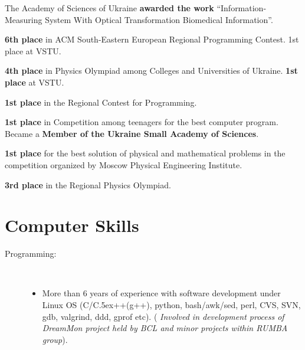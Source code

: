\documentclass[10pt,overlapped,line]{res}
\def\Cplusplus{{\rm C\raise.5ex\hbox{\small ++}}}
\newcommand{\mplace}[1]{\textbf{#1}}
\newcommand{\wdescription}[1]{({\small \textit{#1}})}
\begin{document}
\begin{resume}
 \begin{position}
   The Academy of Sciences of Ukraine \mplace{awarded the work}
   ``Information-Measuring System With Optical Transformation
   Biomedical Information''.
 \end{position}

 \begin{position}
   \mplace{6th place} in ACM South-Eastern European Regional
   Programming Contest. 1st place at VSTU.
 \end{position}

 \begin{position}
   \mplace{4th place} in Physics Olympiad among Colleges and
   Universities of Ukraine. \mplace{1st place} at VSTU.
 \end{position}

 \begin{position}
 \mplace{1st place} in the Regional Contest for Programming.
 \end{position}

 \begin{position}
   \mplace{1st place} in Competition among teenagers for the best
   computer program. Became a \mplace{Member of the Ukraine Small Academy
     of Sciences}.
 \end{position}

 \begin{position}
   \mplace{1st place} for the best solution of physical and mathematical
   problems in the competition organized by Moscow Physical Engineering Institute.
 \end{position}

 \begin{position}
   \mplace{3rd place} in the Regional Physics Olympiad.

 \end{position}

 \section{Computer Skills}
  \begin{description}
    \item[Programming:] \hspace*{\fill} \\
      \begin{itemize}
      \item More than 6 years of experience with software development
        under Linux OS (C/\Cplusplus(g++), python, bash/awk/sed, perl,
        CVS, SVN, gdb, valgrind, ddd, gprof etc).  \wdescription{
          Involved in development process of DreamMon project held by
          BCL and minor projects within RUMBA group}.


\end{itemize}
\end{description}
\end{resume}
\end{document}
